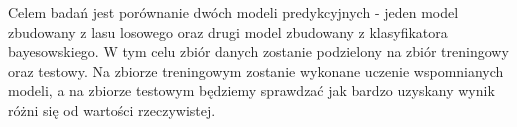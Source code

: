 Celem badań jest porównanie dwóch modeli predykcyjnych - jeden model zbudowany z lasu losowego oraz drugi model zbudowany z klasyfikatora bayesowskiego. W tym celu zbiór danych zostanie podzielony na zbiór treningowy oraz testowy. Na zbiorze treningowym zostanie wykonane uczenie wspomnianych modeli, a na zbiorze testowym będziemy sprawdzać jak bardzo uzyskany wynik różni się od wartości rzeczywistej.
